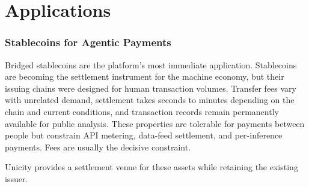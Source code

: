 \part{Applications}\label{part:applications}

\section{Stablecoins for Agentic Payments}

Bridged stablecoins are the platform's most immediate application. Stablecoins are becoming the settlement instrument for the machine economy, but their issuing chains were designed for human transaction volumes. Transfer fees vary with unrelated demand, settlement takes seconds to minutes depending on the chain and current conditions, and transaction records remain permanently available for public analysis. These properties are tolerable for payments between people but constrain API metering, data-feed settlement, and per-inference payments. Fees are usually the decisive constraint.

Unicity provides a settlement venue for these assets while retaining the existing issuer.

